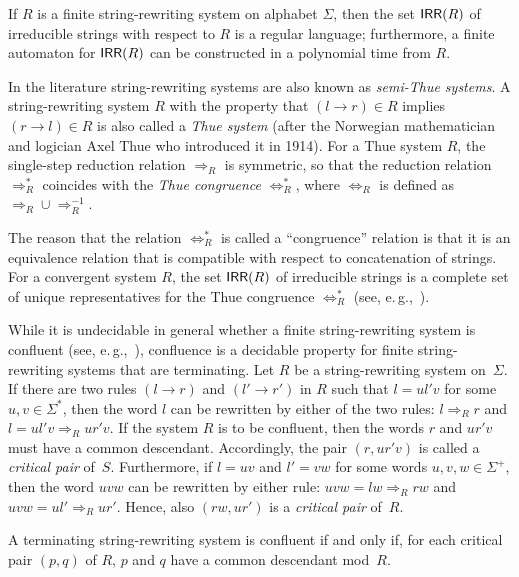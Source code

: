 \begin{lemma}
If $R$ is a finite string-rewriting system on alphabet $\Sigma$, then the set $\textup{\sf IRR}(R)$ of irreducible strings with respect to $R$ is a regular language; furthermore, a finite automaton for $\textup{\sf IRR}(R)$ can be constructed in a polynomial time from $R$.
\end{lemma}

In the literature string-rewriting systems are also known as \emph{semi-Thue systems}. A string-rewriting system $R$ with the property that $(l \to r) \in R$ implies $(r \to l) \in R$ is also called a \emph{Thue system} (after the Norwegian mathematician and logician Axel Thue who introduced it in 1914). For a Thue system $R$, the single-step reduction relation $\Rightarrow_R$ is symmetric, so that the reduction relation $\Rightarrow^*_R$ coincides with the \emph{Thue congruence} $\Leftrightarrow^*_R$, where $\Leftrightarrow_R$ is defined as $\Rightarrow_R \cup \Rightarrow_R^{-1}$.

The reason that the relation $\Leftrightarrow^*_R$ is called a ``congruence'' relation is that it is an equivalence relation that is compatible with respect to concatenation of strings. For a convergent system $R$, the set $\textup{\sf IRR}(R)$ of irreducible strings is a complete set of unique representatives for the Thue congruence $\Leftrightarrow^*_R$ (see, e.\,g.,~\citep{bookOtto93}).

While it is undecidable in general whether a finite string-rewriting system is confluent (see, e.\,g.,~\citep{bookOtto93}), confluence is a decidable property for finite string-rewriting systems that are terminating. Let $R$ be a string-rewriting system on~$\Sigma$. If there are two rules $(l \to r)$ and $(l' \to r')$ in $R$ such that $l = ul'v$ for some $u,v\in\Sigma^*$, then the word $l$ can be rewritten by either of the two rules: $l \Rightarrow_R r$ and $l =ul'v\Rightarrow_R ur'v$. If the system $R$ is to be confluent, then the words $r$ and $ur'v$ must have a common descendant. Accordingly, the pair $(r,ur'v)$ is called a \emph{critical pair} of~$S$. Furthermore, if $l = uv$ and $l'=vw$ for some words $u,v,w\in\Sigma^+$, then the word $uvw$ can be rewritten by either rule: $uvw= l w\Rightarrow_R rw$ and $uvw =ul'\Rightarrow_R ur'$. Hence, also $(rw,ur')$ is  a \emph{critical pair} of~$R$.

\begin{proposition}\label{PropCon}{\rm \citep{KnBe70}}
A terminating string-rewriting system is confluent if and only if, for each critical pair $(p,q)$ of $R$, $p$ and $q$ have a common descendant mod~$R$.
\end{proposition}

